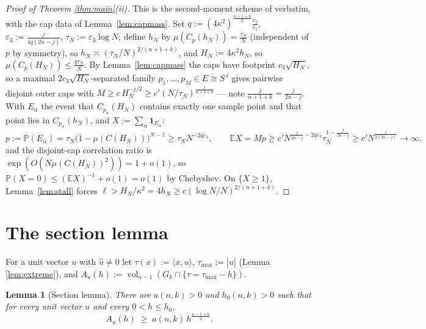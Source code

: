 ﻿\documentclass[11pt]{article}
\newtheorem{lemma}[theorem]{Lemma}
\newcommand{\E}{\mathbb{E}}
\newcommand{\PP}{\mathbb{P}}
\newcommand{\vol}{\operatorname{vol}}
\begin{document}
\begin{proof}[Proof of Theorem \ref{thm:main}(ii)]
This is the second-moment scheme of
\cite{companion4,companion5,companion6} verbatim, with the cap data of
Lemma~\ref{lem:capmass}.  Set $q:=(4\kappa^2)^{\frac{n+1+k}2}\frac{c_2}{c_1}$,
$\varepsilon_3:=\frac{j}{4q(2n-j)}$, $\tau_N:=\varepsilon_3\log N$; define
$h_N$ by $\mu(C_p(h_N))=\frac{\tau_N}N$ (independent of $p$ by symmetry), so
$h_N\asymp(\tau_N/N)^{2/(n+1+k)}$, and $H_N:=4\kappa^2h_N$, so
$\mu(C_p(H_N))\le\frac{q\tau_N}N$.  By Lemma~\ref{lem:capmass} the caps have
footprint $c_3\sqrt{H_N}$, so a maximal $2c_3\sqrt{H_N}$-separated family
$p_1,\dots,p_M\in E\cong S^{\,j}$ gives pairwise disjoint outer caps with
$M\ge c\,H_N^{-j/2}\ge c'(N/\tau_N)^{\frac{j}{n+1+k}}$ --- note
$\frac{j}{n+1+k}=\frac{j}{2n-j}$.  With
$E_\alpha$ the event that $C_{p_\alpha}(H_N)$ contains exactly one sample
point and that point lies in $C_{p_\alpha}(h_N)$, and
$X:=\sum_\alpha\mathbf1_{E_\alpha}$:
\[
p:=\PP(E_\alpha)=\tau_N\bigl(1-\mu(C(H_N))\bigr)^{N-1}
\ge\tau_NN^{-2q\varepsilon_3},
\qquad
\E X=Mp\ge c'N^{\frac j{2n-j}-2q\varepsilon_3}\tau_N^{1-\frac j{2n-j}}
\ge c'N^{\frac j{2(2n-j)}}\to\infty,
\]
and the disjoint-cap correlation ratio is
$\exp(O(N\mu(C(H_N))^2))=1+o(1)$, so
$\PP(X=0)\le(\E X)^{-1}+o(1)=o(1)$ by Chebyshev.  On $\{X\ge1\}$,
Lemma~\ref{lem:stall} forces
$\ell>H_N/\kappa^2=4h_N\ge c(\log N/N)^{2/(n+1+k)}$.
\end{proof}

\section{The section lemma}\label{sec:section}

For a unit vector $u$ with $\hat u\ne0$ let
$\tau(x):=\langle x,u\rangle$, $\tau_{\max}:=|\hat u|$ (Lemma
\ref{lem:extreme}), and
$A_u(h):=\vol_{n-1}(G_k\cap\{\tau=\tau_{\max}-h\})$.

\begin{lemma}[Section lemma]\label{lem:section}
There are $a(n,k)>0$ and $h_0(n,k)>0$ such that for every unit vector $u$ and
every $0<h\le h_0$,
\[
A_u(h)\;\ge\;a(n,k)\,h^{\frac{n-1+k}2} .
\]
\end{lemma}
\end{document}
